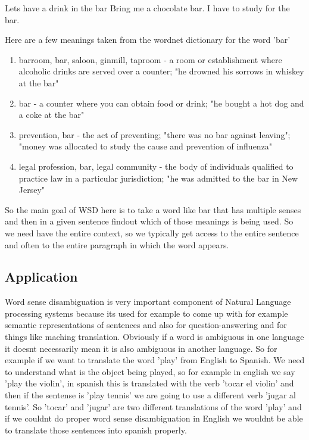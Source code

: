 \documentclass[article,dr=phil,type=drfinal,colorback,accentcolor=tud9c]{tudthesis}
\begin{document}
Lets have a drink in the bar
Bring me a chocolate bar.
I have to study for the bar.

Here are a few meanings taken from the wordnet dictionary for the word 'bar'

\begin{enumerate}
  \item barroom, bar, saloon, ginmill, taproom - a room or establishment where alcoholic drinks are served over a counter; "he drowned his sorrows in whiskey at the bar"
  \item bar - a counter where you can obtain food or drink; "he bought a hot dog and a coke at the bar"
  \item prevention, bar - the act of preventing; "there was no bar against leaving"; "money was allocated to study the cause and prevention of influenza"
  \item legal profession, bar, legal community - the body of individuals qualified to practice law in a particular jurisdiction; "he was admitted to the bar in New Jersey"
\end{enumerate}


So the main goal of WSD here is to take a word like bar that has multiple senses and then in a given sentence findout which of those meanings is being used. So we need have the entire context, so we typically get access to the entire sentence and often to the entire paragraph in which the word appears.


  \subsection{Application}
    Word sense disambiguation is very important component of Natural Language processing systems because its used for example to come up with for example semantic representations of sentences and also for question-answering and for things like maching translation. Obviously if a word is ambiguous in one language it doesnt necessarily mean it is also ambiguous in another language. So for example if we want to translate the word 'play' from English to Spanish. We need to understand what is the object being played, so for example in english we say 'play the violin', in spanish this is translated with the verb 'tocar el violin' and then if the sentense is 'play tennis' we are going to use a different verb 'jugar al tennis'. So 'tocar' and 'jugar' are two different translations of the word 'play' and if we couldnt do proper word sense disambiguation in English we wouldnt be able to translate those sentences into spanish properly.
\end{document}
